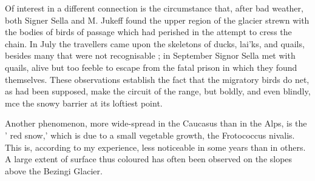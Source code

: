 \documentclass[25pt, a4paper]{article}
\begin{document}
Of interest in a different connection is the circumstance that, after bad weather, both Signer Sella and M. Jukeff found the upper region of the glacier strewn with the bodies of birds of passage which had perished in the attempt to cress the chain. In July the travellers came upon the skeletons of ducks, lai'ks, and quails, besides many that were not recognisable ; in September Signor Sella met with quails, alive but too feeble to escape from the fatal prison in which they found themselves. These observations establish the fact that the migratory birds do net, as had been supposed, make the circuit of the range, but boldly, and even blindly, mce the snowy barrier at its loftiest point.

Another phenomenon, more wide-spread in the Caucasus than in the Alps, is the ' red snow,' which is due to a small vegetable growth, the Frotococcus nivalis. This is, according to my experience, less noticeable in some years than in others. A large extent of surface thus coloured has often been observed on the slopes above the Bezingi Glacier.
\end{document}
